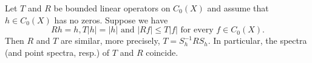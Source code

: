 \begin{lemma}\label{lem:b3-2.3}
Let $T$ and $R$ be bounded linear operators on $C_{0}(X)$ and assume that $h \in C_{0}(X)$ has no zeros. Suppose we have
\begin{equation}\label{eq:b3-2.8}
	Rh = h, T|h| = |h| \text{ and } |Rf| \leq T|f| \text{ for every $f \in C_{0}(X)$.} 
\end{equation}
Then $R$ and $T$ are similar, more precisely, $T = S_{h}^{-1}RS_{h}$.
In particular, the spectra (and point spectra, resp.) of $T$ and $R$ coincide.
\end{lemma}
